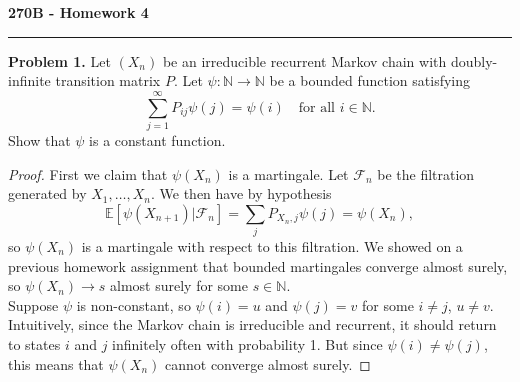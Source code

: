 \documentclass[11pt,letterpaper]{report}
\newcommand{\naturals}{\mathbb{N}}
\newcommand{\mcal}[1]{\mathcal{#1}}
\newcommand{\E}{\mathbb{E}}
\begin{document}
\begin{center}
{\bf \Large 270B - Homework 4}
\vspace{0.2cm}
\hrule
\end{center}

\noindent\textbf{Problem 1. }
Let $(X_n)$ be an irreducible recurrent Markov chain with doubly-infinite transition matrix $P$. Let $\psi: \naturals\to \naturals$ be a bounded function satisfying
\[
\sum_{j=1}^\infty P_{ij}\psi(j) = \psi(i)\quad\text{for all }i\in \naturals.
\]
Show that $\psi$ is a constant function.
\begin{proof}
	First we claim that $\psi(X_n)$ is a martingale. Let $\mcal{F}_n$ be the filtration generated by $X_1, \ldots, X_n$. We then have by hypothesis
	\[
	\E[\psi(X_{n+1})|\mcal{F}_n] = \sum_{j}P_{X_n, j}\psi(j) = \psi(X_n),
	\]
	so $\psi(X_n)$ is a martingale with respect to this filtration. We showed on a previous homework assignment that bounded martingales converge almost surely, so $\psi(X_n)\to s$ almost surely for some $s\in \naturals$.\\

	\noindent Suppose $\psi$ is non-constant, so $\psi(i) = u$ and $\psi(j) = v$ for some $i\neq j$, $u\neq v$. Intuitively, since the Markov chain is irreducible and recurrent, it should return to states $i$ and $j$ infinitely often with probability 1. But since $\psi(i)\neq \psi(j)$, this means that $\psi(X_n)$ cannot converge almost surely. 
\end{proof}
\end{document}
